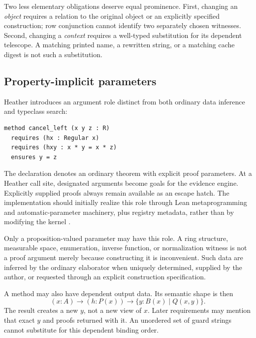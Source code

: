 \documentclass[11pt,letterpaper]{article}
\newcommand{\code}[1]{\texttt{\detokenize{#1}}}
\theoremstyle{definition}\newtheorem{definition}[theorem]{Definition}
\theoremstyle{remark}\newtheorem{remark}[theorem]{Remark}
\begin{document}
Two less elementary obligations deserve equal prominence. First, changing an
\emph{object} requires a relation to the original object or an explicitly
specified construction; row conjunction cannot identify two separately chosen
witnesses. Second, changing a \emph{context} requires a well-typed substitution
for its dependent telescope. A matching printed name, a rewritten string, or a
matching cache digest is not such a substitution.

\subsection{Property-implicit parameters}
Heather introduces an argument role distinct from both ordinary data inference
and typeclass search:
\par\noindent\begin{minipage}{\linewidth}
\begin{lstlisting}
method cancel_left (x y z : R)
  requires (hx : Regular x)
  requires (hxy : x * y = x * z)
  ensures y = z
\end{lstlisting}
\end{minipage}\par
The declaration denotes an ordinary theorem with explicit proof parameters.
At a Heather call site, designated \code{requires} arguments become goals for
the evidence engine. Explicitly supplied proofs always remain available as an
escape hatch. The implementation should initially realize this role through
Lean metaprogramming and automatic-parameter machinery, plus registry metadata,
rather than by modifying the kernel \cite{lean-application}.

Only a proposition-valued parameter may have this role. A ring structure,
measurable space, enumeration, inverse function, or normalization witness is
not a proof argument merely because constructing it is inconvenient. Such data
are inferred by the ordinary elaborator when uniquely determined, supplied by
the author, or requested through an explicit construction specification.

A method may also have dependent output data. Its semantic shape is then
\[
 (x:A)\to (h:P(x))\to\{y:B(x)\mid Q(x,y)\}.
\]
The result creates a new $y$, not a new view of $x$. Later requirements may
mention that exact $y$ and proofs returned with it. An unordered set of guard
strings cannot substitute for this dependent binding order.
\end{document}
